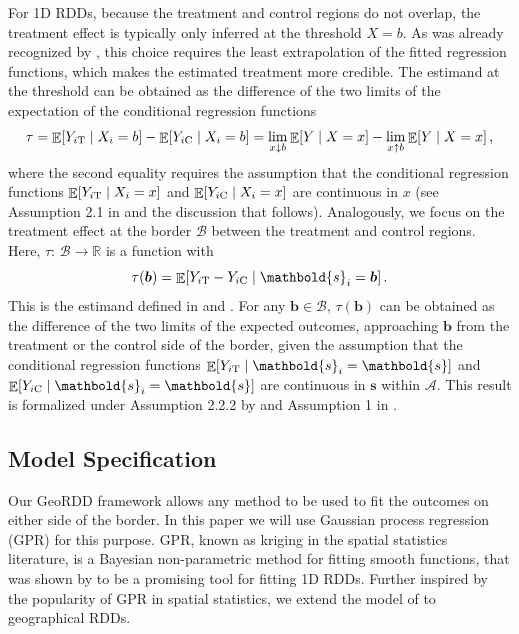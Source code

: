 \documentclass[letter,12pt]{article}
\DeclarePairedDelimiter{\squarebracket}{\lbrack}{\rbrack}
\newcommand{\sbr}[1]{\squarebracket*{#1}}
\DeclareMathOperator{\E}{\mathbb{E}}
\newcommand{\area}{\mathcal{A}}
\newcommand{\treat}{\mathrm{T}}
\newcommand{\ctrol}{\mathrm{C}}
\newcommand{\svec}{\mathbold{s}}
\newcommand{\border}{\mathcal{B}}
\newcommand{\sentinel}{\bm{b}}
\newcommand{\eqlabel}[1]{\label{#1}}
\begin{document}
For 1D RDDs, because the treatment and control regions do not overlap, the treatment effect is typically only inferred at the threshold \(X=b\).
As was already recognized by \cite{thistlethwaite1960regression}, this choice requires the least extrapolation of the fitted regression functions, which makes the estimated treatment more credible.
The estimand at the threshold can be obtained as the difference of the two limits of the expectation of the conditional regression functions
\begin{equation}
    \eqlabel{eq:rdd_univ_estimand}
    \tau = \E\sbr{Y_{i\treat} \mid X_i=b} - \E\sbr{Y_{i\ctrol} \mid X_i=b} = \lim_{x \downarrow b} \E\sbr{Y \mid X=x} - \lim_{x \uparrow b} \E\sbr{Y \mid X=x}\,,
\end{equation}
where the second equality requires the assumption that the conditional regression functions \(\E\sbr{Y_{i\treat} \mid X_i=x}\) and \(\E\sbr{Y_{i\ctrol} \mid X_i=x}\) are continuous in \(x\) (see Assumption 2.1 in \cite{imbensrdd} and the discussion that follows).
Analogously, we focus on the treatment effect at the border \(\border\) between the treatment and control regions.
Here, \(\tau:\,\border \rightarrow \mathbb{R}\) is a function with
\begin{equation}
    \tau(\sentinel) =  \E\sbr{Y_{i\treat} - Y_{i\ctrol} \mid \svec_i = \sentinel} \,.
    \eqlabel{eq:functional_estimand}
\end{equation}
This is the estimand defined in \cite{imbens2011regression} and \cite{keele_titiunik_2015}.
For any \(\sentinel \in \border\), \(\tau(\sentinel)\) can be obtained as the difference of the two limits of the expected outcomes, approaching \(\sentinel\) from the treatment or the control side of the border, given the assumption that the conditional regression functions \(\E\sbr{Y_{i\treat} \mid \svec_i=\svec}\) and \(\E\sbr{Y_{i\ctrol} \mid \svec_i=\svec}\) are continuous in \(\svec\) within \(\area\).
This result is formalized under Assumption 2.2.2 by \cite{imbens2011regression} and Assumption 1 in \cite{keele_titiunik_2015}.



\hypertarget{model-specification}{%
\subsection{Model Specification}\label{model-specification}}


\label{sec:twogp}
Our GeoRDD framework allows any method to be used to fit the outcomes on either side of the border.
In this paper we will use Gaussian process regression (GPR) for this purpose.
GPR, known as kriging in the spatial statistics literature, is a Bayesian non-parametric method for fitting smooth functions, that was shown by \cite{Branson:2017qy} to be a promising tool for fitting 1D RDDs.
Further inspired by the popularity of GPR in spatial statistics, we extend the model of \cite{Branson:2017qy} to geographical RDDs.
\end{document}
